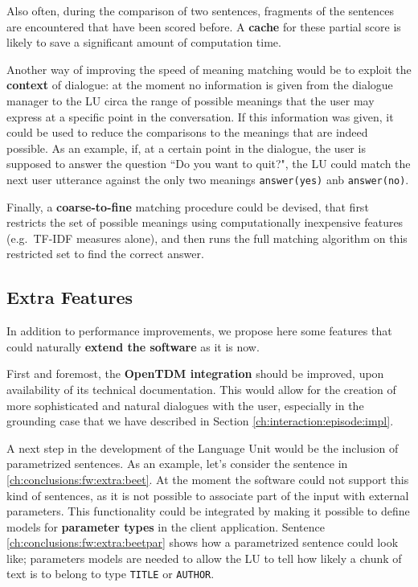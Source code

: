 Also often, during the comparison of two sentences, fragments of the sentences are encountered that have been scored before. A \textbf{cache} for these partial score is likely to save a significant amount of computation time.

Another way of improving the speed of meaning matching would be to exploit the \textbf{context} of dialogue: at the moment no information is given from the dialogue manager to the LU circa the range of possible meanings that the user may express at a specific point in the conversation. If this information was given, it could be used to reduce the comparisons to the meanings that are indeed possible. As an example, if, at a certain point in the dialogue, the user is supposed to answer the question ``Do you want to quit?", the LU could match the next user utterance against the only two meanings \texttt{answer(yes)} anb \texttt{answer(no)}.

Finally, a \textbf{coarse-to-fine} matching procedure could be devised, that first restricts the set of possible meanings using computationally inexpensive features (e.g.\ TF-IDF measures alone), and then runs the full matching algorithm on this restricted set to find the correct answer.

\subsection{Extra Features}\label{ch:conclusions:fw:extra}
In addition to performance improvements, we propose here some features that could naturally \textbf{extend the software} as it is now.

First and foremost, the \textbf{OpenTDM integration} should be improved, upon availability of its technical documentation. This would allow for the creation of more sophisticated and natural dialogues with the user, especially in the grounding case that we have described in Section \ref{ch:interaction:episode:impl}.

A next step in the development of the Language Unit would be the inclusion of parametrized sentences. As an example, let's consider the sentence in \ref{ch:conclusions:fw:extra:beet}. At the moment the software could not support this kind of sentences, as it is not possible to associate part of the input with external parameters. This functionality could be integrated by making it possible to define models for \textbf{parameter types} in the client application. Sentence \ref{ch:conclusions:fw:extra:beetpar} shows how a parametrized sentence could look like; parameters models are needed to allow the LU to tell how likely a chunk of text is to belong to type \texttt{TITLE} or \texttt{AUTHOR}.

